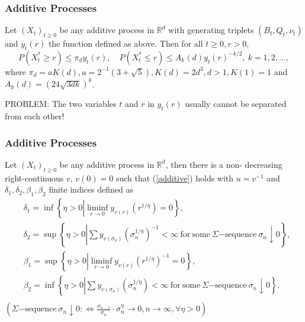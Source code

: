 \documentclass[12pt]{beamer}
\def\RR{\mathbb{R}}
\begin{document}
\begin{frame}
	\frametitle{Additive Processes}
	\begin{lemma}
		Let $(X_t)_{t\ge0}$ be any additive process in $\RR^d$ with generating triplets $(B_t,Q_t,\nu_t)$ and $y_t(r)$ the function defined as above. Then for all $t\ge0,r>0$,
		\begin{equation*}
			P(X_t^*\ge r)\le\pi_d y_t(r),\quad P(X_t^*\le r)\le A_k(d)y_t(r)^{-k/2},\ k=1,2,\ldots,
		\end{equation*}
		where $\pi_d=aK(d),a=2^{-1}(3+\sqrt5),K(d)=2d^3,d>1,K(1)=1$ and $A_k(d)=(24\sqrt{3dk})^k$.
	\end{lemma}
	\pause
	\vspace{2ex}
	PROBLEM: The two variables $t$ and $r$ in $y_t(r)$ usually cannot be separated from each other!
\end{frame}
\begin{frame}
	\frametitle{Additive Processes}
	\begin{theorem}
		Let $(X_t)_{t\ge0}$ be any additive process in $\RR^d$, then there is a non- decreasing right-continuous $v$, $v(0)=0$ such that (\ref{additive}) holds with $u=v^{-1}$ and $\delta_1,\delta_2,\beta_1,\beta_2$ finite indices defined as \small
		\begin{equation*}
			\begin{split}
				& \delta_1=\inf\left\{ \eta>0 \left| \liminf_{r\to0}y_{v(r)}(r^{1/\eta})=0 \right. \right\},\\
				& \delta_2=\sup\left\{ \eta>0 \left| \sum y_{v(\sigma_n)}(\sigma_n^{1/\eta})^{-1}<\infty\mathrm{\ for\ some\ }\Sigma\mathrm{-sequence\ }\sigma_n\downarrow0 \right. \right\},\\
				& \beta_1=\sup\left\{ \eta>0 \left| \liminf_{r\to0}y_{v(r)}(r^{1/\eta})^{-1}=0 \right. \right\},\\
				& \beta_2=\inf\left\{ \eta>0 \left| \sum y_{v(\sigma_n)}(\sigma_n^{1/\eta})<\infty\mathrm{\ for\ some\ }\Sigma\mathrm{-sequence\ }\sigma_n\downarrow0 \right. \right\}.\\
			\end{split}
		\end{equation*}
		$(\Sigma\mathrm{-sequence\ }\sigma_n\downarrow0 :\Leftrightarrow \frac{\sigma_{n-1}}{\sigma_n}\cdot \sigma_n^\eta\to0,n\to\infty,\forall \eta>0)$
	\end{theorem}
\end{frame}
\end{document}
